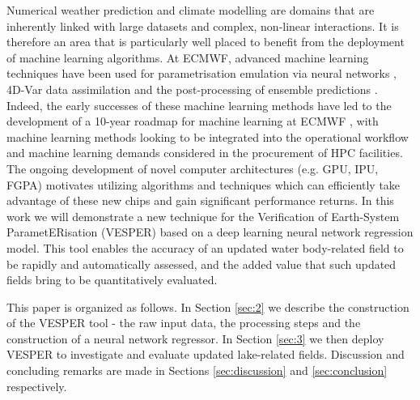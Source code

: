 \documentclass[hess, twostagejnl]{copernicus}
\begin{document}
\noindent Numerical weather prediction and climate modelling are domains that are inherently linked with large datasets and complex, non-linear interactions. It is therefore an area that is particularly well placed to benefit from the deployment of machine learning algorithms. At ECMWF, advanced machine learning techniques have been used for parametrisation emulation via neural networks \citep{Chantry2021}, 4D-Var data assimilation \citep{Hatfield2021} and the post-processing of ensemble predictions \citep{Hewson2021}. Indeed, the early successes of these machine learning methods have led to the development of a 10-year roadmap for machine learning at ECMWF \citep{p19877}, with machine learning methods looking to be integrated into the operational workflow and machine learning demands considered in the procurement of HPC facilities. The ongoing development of novel computer architectures (e.g. GPU, IPU, FGPA) motivates utilizing algorithms and techniques which can efficiently take advantage of these new chips and gain significant performance returns. In this work we will demonstrate a new technique for the Verification of Earth-System ParametERisation (VESPER) based on a deep learning neural network regression model. This tool enables the accuracy of an updated water body-related field to be rapidly and automatically assessed, and the added value that such updated fields bring to be quantitatively evaluated. \newline 


\noindent This paper is organized as follows. In Section \ref{sec:2} we describe the construction of the VESPER tool - the raw input data, the processing steps and the construction of a neural network regressor. In Section \ref{sec:3} we then deploy VESPER to investigate and evaluate updated lake-related fields. Discussion and concluding remarks are made in Sections \ref{sec:discussion} and \ref{sec:conclusion} respectively. 
\end{document}
